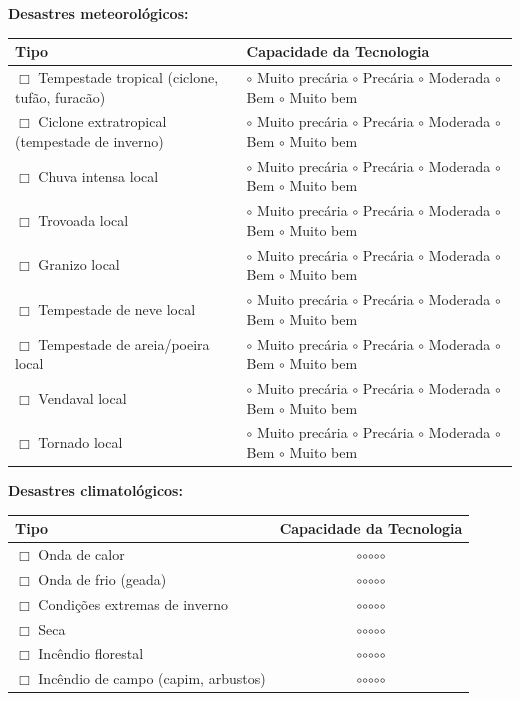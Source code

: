 \textbf{Desastres meteorológicos:}

{
\begin{longtable}[]{@{}
  >{\raggedright\arraybackslash}p{}
  >{\centering\arraybackslash}p{}@{}}
\toprule\noalign{}
\begin{minipage}[b]{\linewidth}\raggedright
Tipo
\end{minipage} & \begin{minipage}[b]{\linewidth}\centering
Capacidade da Tecnologia
\end{minipage} \\
\midrule\noalign{}
\endhead
\bottomrule\noalign{}
\endlastfoot
$\Box$ Tempestade tropical (ciclone, tufão, furacão) & $\circ$ Muito precária $\circ$ Precária $\circ$ Moderada $\circ$ Bem $\circ$ Muito bem \\
$\Box$ Ciclone extratropical (tempestade de inverno) & $\circ$ Muito precária $\circ$ Precária $\circ$ Moderada $\circ$ Bem $\circ$ Muito bem \\
$\Box$ Chuva intensa local & $\circ$ Muito precária $\circ$ Precária $\circ$ Moderada $\circ$ Bem $\circ$ Muito bem \\
$\Box$ Trovoada local & $\circ$ Muito precária $\circ$ Precária $\circ$ Moderada $\circ$ Bem $\circ$ Muito bem \\
$\Box$ Granizo local & $\circ$ Muito precária $\circ$ Precária $\circ$ Moderada $\circ$ Bem $\circ$ Muito bem \\
$\Box$ Tempestade de neve local & $\circ$ Muito precária $\circ$ Precária $\circ$ Moderada $\circ$ Bem $\circ$ Muito bem \\
$\Box$ Tempestade de areia/poeira local & $\circ$ Muito precária $\circ$ Precária $\circ$ Moderada $\circ$ Bem $\circ$ Muito bem \\
$\Box$ Vendaval local & $\circ$ Muito precária $\circ$ Precária $\circ$ Moderada $\circ$ Bem $\circ$ Muito bem \\
$\Box$ Tornado local & $\circ$ Muito precária $\circ$ Precária $\circ$ Moderada $\circ$ Bem $\circ$ Muito bem \\
\end{longtable}
}

\textbf{Desastres climatológicos:}

{
\begin{longtable}[]{@{}lc@{}}
\toprule\noalign{}
Tipo & Capacidade da Tecnologia \\
\midrule\noalign{}
\endhead
\bottomrule\noalign{}
\endlastfoot
$\Box$ Onda de calor & $\circ$$\circ$$\circ$$\circ$$\circ$ \\
$\Box$ Onda de frio (geada) & $\circ$$\circ$$\circ$$\circ$$\circ$ \\
$\Box$ Condições extremas de inverno & $\circ$$\circ$$\circ$$\circ$$\circ$ \\
$\Box$ Seca & $\circ$$\circ$$\circ$$\circ$$\circ$ \\
$\Box$ Incêndio florestal & $\circ$$\circ$$\circ$$\circ$$\circ$ \\
$\Box$ Incêndio de campo (capim, arbustos) & $\circ$$\circ$$\circ$$\circ$$\circ$ \\
\end{longtable}
}

